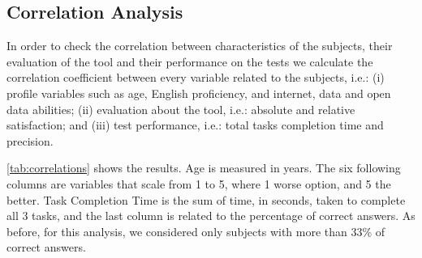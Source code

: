 
\subsection{Correlation Analysis}

In order to check the correlation between characteristics of the subjects, their evaluation of the tool and their performance on the tests we calculate the correlation coefficient between every variable related to the subjects, i.e.: (i) profile variables such as age, English proficiency, and internet, data and open data abilities; (ii) evaluation about the tool, i.e.: absolute and relative satisfaction; and (iii) test performance, i.e.: total tasks completion time and precision.

\autoref{tab:correlations} shows the results.
Age is measured in years. The six following columns are variables that scale from 1 to 5, where 1 worse option, and 5 the better.
Task Completion Time is the sum of time, in seconds, taken to complete all 3 tasks, and the last column is related to the percentage of correct answers.
As before, for this analysis, we considered only subjects with more than 33\% of correct answers.

